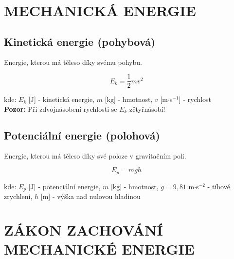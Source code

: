 \documentclass[a4paper,11pt]{article}
\begin{document}
\section{MECHANICKÁ ENERGIE}

\subsection{Kinetická energie (pohybová)}

\begin{definitionbox}
Energie, kterou má těleso díky svému pohybu.
\end{definitionbox}

\begin{equationbox}
\begin{equation*}
    E_k = \frac{1}{2}mv^2
\end{equation*}
\end{equationbox}

\begin{notebox}
kde: $E_k$ [J] - kinetická energie, $m$ [kg] - hmotnost, $v$ [m$\cdot$s$^{-1}$] - rychlost\\
\textbf{Pozor:} Při zdvojnásobení rychlosti se $E_k$ zčtyřnásobí!
\end{notebox}

\subsection{Potenciální energie (polohová)}

\begin{definitionbox}
Energie, kterou má těleso díky své poloze v gravitačním poli.
\end{definitionbox}

\begin{equationbox}
\begin{equation*}
    E_p = mgh
\end{equation*}
\end{equationbox}

\begin{notebox}
kde: $E_p$ [J] - potenciální energie, $m$ [kg] - hmotnost, $g = 9{,}81$ m$\cdot$s$^{-2}$ - tíhové zrychlení, $h$ [m] - výška nad nulovou hladinou
\end{notebox}

\newpage

\section{ZÁKON ZACHOVÁNÍ MECHANICKÉ ENERGIE}
\end{document}
